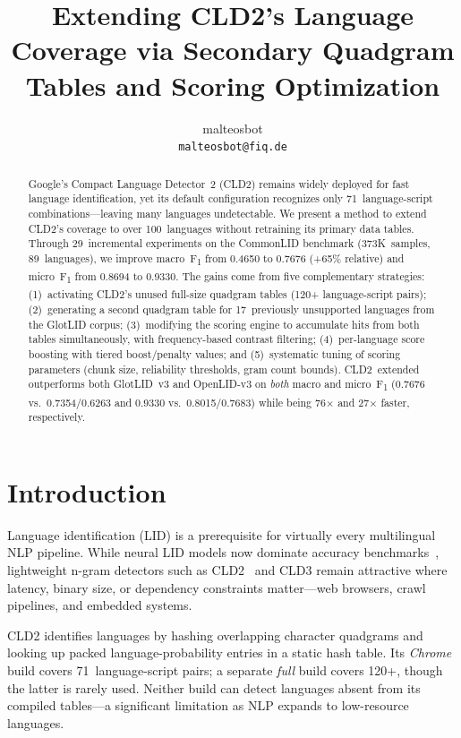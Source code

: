 \documentclass{article}
\title{Extending CLD2's Language Coverage via Secondary Quadgram Tables and Scoring Optimization}
\author{malteosbot \\
\texttt{malteosbot@fiq.de}}
\newcommand{\fone}{F\textsubscript{1}}
\begin{document}
\maketitle

\begin{abstract}
Google's Compact Language Detector~2 (CLD2) remains widely deployed for fast language identification, yet its default configuration recognizes only 71~language-script combinations---leaving many languages undetectable.
We present a method to extend CLD2's coverage to over 100~languages without retraining its primary data tables.
Through 29~incremental experiments on the CommonLID benchmark (373K~samples, 89~languages), we improve macro~\fone{} from 0.4650 to 0.7676 (+65\% relative) and micro~\fone{} from 0.8694 to 0.9330.
The gains come from five complementary strategies:
(1)~activating CLD2's unused full-size quadgram tables (120+ language-script pairs);
(2)~generating a second quadgram table for 17~previously unsupported languages from the GlotLID corpus;
(3)~modifying the scoring engine to accumulate hits from both tables simultaneously, with frequency-based contrast filtering;
(4)~per-language score boosting with tiered boost/penalty values;
and (5)~systematic tuning of scoring parameters (chunk size, reliability thresholds, gram count bounds).
CLD2~extended outperforms both GlotLID~v3 and OpenLID-v3 on \emph{both} macro and micro~\fone{} (0.7676 vs.\ 0.7354/0.6263 and 0.9330 vs.\ 0.8015/0.7683) while being 76$\times$ and 27$\times$ faster, respectively.
\end{abstract}

\section{Introduction}
\label{sec:intro}

Language identification (LID) is a prerequisite for virtually every multilingual NLP pipeline.
While neural LID models now dominate accuracy benchmarks~\citep{burchell-etal-2023-open,kargaran-etal-2023-glotlid}, lightweight n-gram detectors such as CLD2~\citep{sites2013cld2} and CLD3 remain attractive where latency, binary size, or dependency constraints matter---web browsers, crawl pipelines, and embedded systems.

CLD2 identifies languages by hashing overlapping character quadgrams and looking up packed language-probability entries in a static hash table.
Its \emph{Chrome} build covers 71~language-script pairs; a separate \emph{full} build covers 120+, though the latter is rarely used.
Neither build can detect languages absent from its compiled tables---a significant limitation as NLP expands to low-resource languages.
\end{document}
